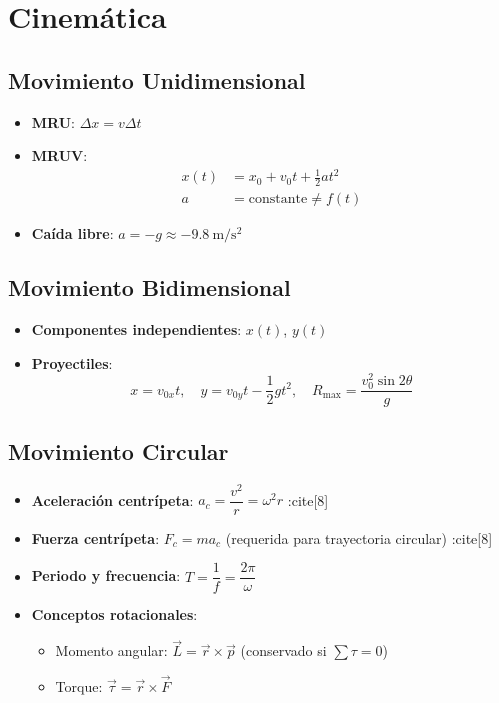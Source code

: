 \documentclass[12pt, a4paper, spanish]{article}
\begin{document}
\section{Cinemática}
\subsection{Movimiento Unidimensional}
\begin{itemize}
    \item \textbf{MRU}: $\Delta x = v \Delta t$
    \item \textbf{MRUV}:
    \begin{align*}
    x(t) &= x_0 + v_0t + \frac{1}{2}at^2 \\
    a &= \text{constante} \neq f(t)
    \end{align*}
    \item \textbf{Caída libre}: $a = -g \approx \SI{-9.8}{\meter\per\second\squared}$
\end{itemize}

\subsection{Movimiento Bidimensional}
\begin{itemize}
    \item \textbf{Componentes independientes}: $x(t)$, $y(t)$
    \item \textbf{Proyectiles}:
    \[
    x = v_{0x}t, \quad y = v_{0y}t - \frac{1}{2}gt^2, \quad R_{\text{max}} = \frac{v_0^2 \sin 2\theta}{g}
    \]
\end{itemize}

\subsection{Movimiento Circular}
\begin{itemize}
    \item \textbf{Aceleración centrípeta}: $a_c = \dfrac{v^2}{r} = \omega^2 r$ :cite[8]
    \item \textbf{Fuerza centrípeta}: $F_c = m a_c$ (requerida para trayectoria circular) :cite[8]
    \item \textbf{Periodo y frecuencia}: $T = \dfrac{1}{f} = \dfrac{2\pi}{\omega}$
    \item \textbf{Conceptos rotacionales}:
    \begin{itemize}
        \item Momento angular: $\vec{L} = \vec{r} \times \vec{p}$ (conservado si $\sum \tau = 0$)
        \item Torque: $\vec{\tau} = \vec{r} \times \vec{F}$
    \end{itemize}
\end{itemize}
\end{document}
